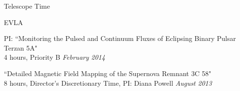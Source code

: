 \documentclass{resume} %
\begin{document}

\begin{rSection}{Telescope Time}

\begin{rSubsection}{EVLA}{}{}{}
\item PI: ``Monitoring the Pulsed and Continuum Fluxes of Eclipsing Binary Pulsar Terzan 5A" \\
4 hours, Priority B \hfill {\em February 2014}
\item ``Detailed Magnetic Field Mapping of the Supernova Remnant 3C 58" \\
8 hours, Director's Discretionary Time, PI: Diana Powell \hfill {\em August 2013}
\end{rSubsection}

\end{rSection}

\end{document}
